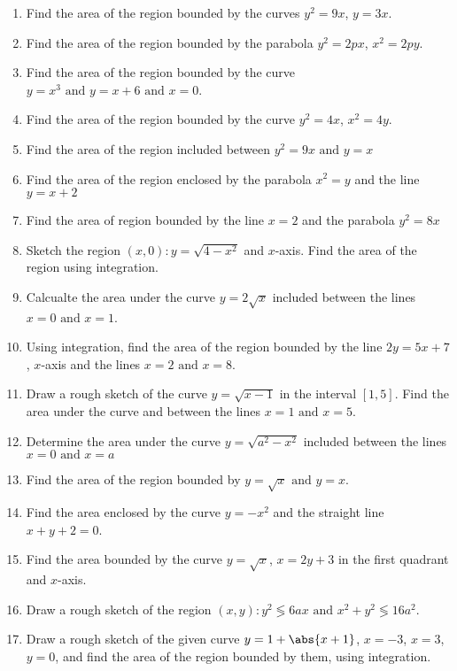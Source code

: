 
\begin{enumerate}[label=\thesection.\arabic*,ref=\thesection.\theenumi]
\item Find the area of the region bounded by the curves $y^2 = 9x$, $y = 3x$.
\item Find the area of the region bounded by the parabola $y^2 = 2px$, $x^2 = 2py$.
\item Find the area of the region bounded by the curve $y = x^3\text{ and }y = x + 6\text{ and }x = 0$.
\item Find the area of the region bounded by the curve $y^2 = 4x$, $x^2 = 4y$.
\item Find the area of the region included between $y^2 = 9x\text{ and }y =x$
\item Find the area of the region enclosed by the parabola $x^2 = y$ and the line $y = x + 2$
\item Find the area of region bounded by the line $x = 2$ and the parabola $y^2 = 8x$
\item Sketch the region ${(x,0) : y = \sqrt{4 - x^2}}$ and $x$-axis. Find the area of the region using integration.
\item Calcualte the area under the curve $y = 2\sqrt{x}$ included between the lines $x = 0\text{ and }x = 1$.
\item Using integration, find the area of the region bounded by the line $2y = 5x + 7$, $x$-axis and the lines $x = 2\text{ and }x =8$.
\item Draw a rough sketch of the curve $y = \sqrt{x - 1}$ in the interval $[1, 5]$. Find the area under the curve and between the lines $x = 1\text{ and }x = 5$.
\item Determine the area under the curve $y = \sqrt{a^2 - x^2}$ included between the lines $x = 0\text{ and }x = a$
\item Find the area of the region bounded by $y = \sqrt{x}\text{ and }y = x$.
\item Find the area enclosed by the curve $y = - x^2$ and the straight line $x + y + 2 = 0$.
\item Find the area bounded by the curve $y = \sqrt{x}$, $x = 2y + 3$ in the first quadrant and $x$-axis.
\item Draw a rough sketch of the region ${(x, y) : y^2 \lessgtr 6ax\text{ and }x^2 + y^2 \lessgtr 16a^2}$.
\item Draw a  rough sketch of the given curve $y =1 + \abs{x + 1}$, $x = -3$, $x = 3$, $y = 0$, and find the area of the region bounded by them, using integration.

\end{enumerate}
